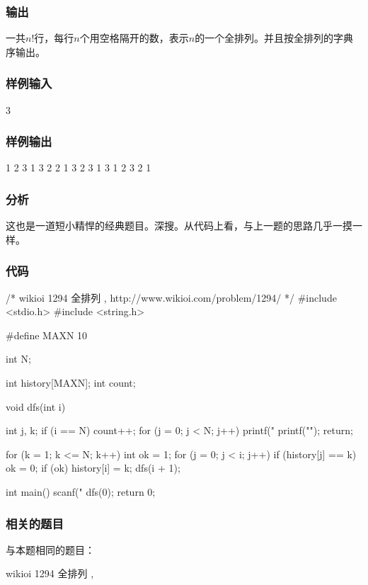 \subsubsection{输出}
一共$n!$行，每行$n$个用空格隔开的数，表示$n$的一个全排列。并且按全排列的字典序输出。

\subsubsection{样例输入}
\begin{Code}
3
\end{Code}

\subsubsection{样例输出}
\begin{Code}
1 2 3
1 3 2
2 1 3
2 3 1
3 1 2
3 2 1
\end{Code}

\subsubsection{分析}
这也是一道短小精悍的经典题目。深搜。从代码上看，与上一题的思路几乎一摸一样。

\subsubsection{代码}
\begin{Codex}[label=all_permutations.c]
/* wikioi 1294 全排列   , http://www.wikioi.com/problem/1294/ */
#include <stdio.h>
#include <string.h>

#define MAXN 10

int N;

int history[MAXN];
int count;

void dfs(int i) {
    int j, k;
    if (i == N) {
        count++;
        for (j = 0; j < N; j++) {
            printf("%
        }
        printf("\n");
        return;
    }

    for (k = 1; k <= N; k++) {
        int ok = 1;
        for (j = 0; j < i; j++) {
            if (history[j] == k)
                ok = 0;
        }
        if (ok) {
            history[i] = k;
            dfs(i + 1);
        }
    }
}

int main() {
    scanf("%
    dfs(0);
    return 0;
}
\end{Codex}

\subsubsection{相关的题目}
与本题相同的题目：
\begindot
\item wikioi 1294 全排列 , 
\myenddot

